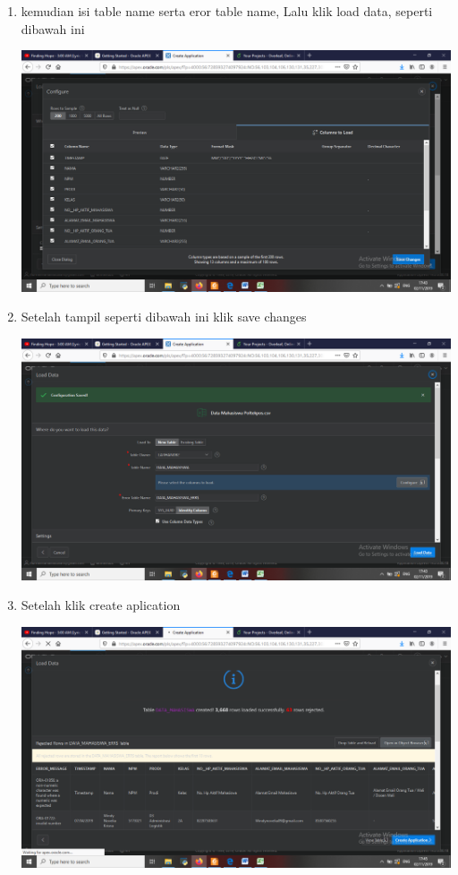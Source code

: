 \begin{enumerate}
    \item kemudian isi table name serta eror table name, Lalu klik load data, seperti dibawah ini
	\begin{center}
    \includegraphics[scale=0.2]{Apex/14.png}
    \end{center}

    \item Setelah tampil seperti dibawah ini klik save changes
	\begin{center}
    \includegraphics[scale=0.2]{Apex/15.png}
    \end{center}
    
    \item Setelah klik create aplication
	\begin{center}
    \includegraphics[scale=0.2]{Apex/16.png}
    \end{center}


\end{enumerate}
